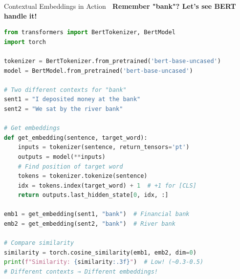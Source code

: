 \documentclass[aspectratio=169]{beamer}
\begin{document}
\begin{frame}[fragile]{Contextual Embeddings in Action 🔬}
\textbf{Remember "bank"? Let's see BERT handle it!}

\begin{lstlisting}[language=Python]
from transformers import BertTokenizer, BertModel
import torch

tokenizer = BertTokenizer.from_pretrained('bert-base-uncased')
model = BertModel.from_pretrained('bert-base-uncased')

# Two different contexts for "bank"
sent1 = "I deposited money at the bank"
sent2 = "We sat by the river bank"

# Get embeddings
def get_embedding(sentence, target_word):
    inputs = tokenizer(sentence, return_tensors='pt')
    outputs = model(**inputs)
    # Find position of target word
    tokens = tokenizer.tokenize(sentence)
    idx = tokens.index(target_word) + 1  # +1 for [CLS]
    return outputs.last_hidden_state[0, idx, :]

emb1 = get_embedding(sent1, "bank")  # Financial bank
emb2 = get_embedding(sent2, "bank")  # River bank

# Compare similarity
similarity = torch.cosine_similarity(emb1, emb2, dim=0)
print(f"Similarity: {similarity:.3f}")  # Low! (~0.3-0.5)
# Different contexts → Different embeddings!
\end{lstlisting}
\end{frame}
\end{document}
